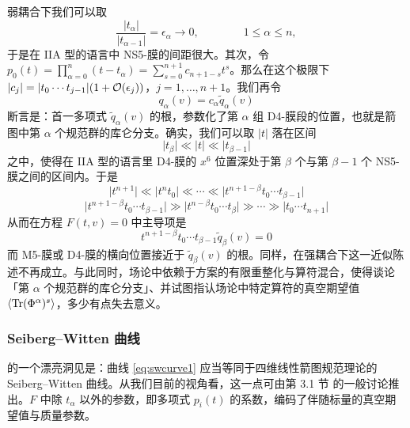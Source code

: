 弱耦合下我们可以取
\begin{equation}\label{eq:wkcpl}
\frac{\vert t_{\alpha}\vert }{\vert t_{\alpha-1} \vert}  = \epsilon_\alpha \to
0, \qquad\qquad 1\leq \alpha \leq n,
\end{equation}
于是在 IIA 型的语言中 NS5-膜的间距很大。其次，令 $p_0(t) =\prod_{\alpha=0}^n (t-t_\alpha) = \sum_{s=0}^{n+1} c_{n+1-s}t^s $。那么在这个极限下 $\vert c_j\vert = \vert t_0 \cdots t_{j-1}\vert (1+ \mathcal{O}(\epsilon_{j}) ) $，$j=1,\dots, n+1$。我们再令
\begin{equation}\label{eq:wkcpl2}
q_\alpha(v) = c_\alpha \tilde q_\alpha(v)
\end{equation}
断言是：首一多项式 $\tilde q_\alpha(v)$ 的根，参数化了第 $\alpha$ 组 D4-膜段的位置，也就是箭图中第 $\alpha$ 个规范群的库仑分支。确实，我们可以取 $\vert t\vert $ 落在区间
\begin{equation}
\label{eq:wkcpl-range}
\vert t_{\beta} \vert \ll \vert t \vert \ll \vert t_{\beta-1} \vert
\end{equation}
之中，使得在 IIA 型的语言里 D4-膜的 $x^6$ 位置深处于第 $\beta$ 个与第 $\beta-1$ 个 NS5-膜之间的区间内。于是
\begin{equation}
\label{eq:wkcpl-ineq1}
\vert t^{n+1} \vert \ll \vert t^{n} t_0 \vert \ll \cdots \ll \vert
t^{n+1-\beta} t_0 \cdots t_{\beta-1} \vert
\end{equation}
\begin{equation}
\label{eq:wkcpl-ineq2}
\vert t^{n+1-\beta} t_0 \cdots t_{\beta-1} \vert \gg \vert t^{n-\beta
}t_0\cdots t_{\beta} \vert \gg \cdots \gg \vert t_0 \cdots t_{n+1}
\vert
\end{equation}
从而在方程 $F(t,v) = 0$ 中主导项是
\begin{equation}
\label{eq:wkcpl-dom}
t^{n+1-\beta} t_0 \cdots t_{\beta-1} \tilde q_\beta(v) =0
\end{equation}
而 M5-膜或 D4-膜的横向位置接近于 $\tilde q_\beta(v)$ 的根。同样，在强耦合下这一近似陈述不再成立。与此同时，场论中依赖于方案的有限重整化与算符混合，使得谈论「第 $\alpha$ 个规范群的库仑分支」、并试图指认场论中特定算符的真空期望值 $\langle {\operatorname{Tr}} (\Phi^{\alpha})^s \rangle$，多少有点失去意义。

\subsubsection*{Seiberg–Witten 曲线}

\cite{Witten:1997sc} 的一个漂亮洞见是：曲线 \eqref{eq:swcurve1} 应当等同于四维线性箭图规范理论的 Seiberg–Witten 曲线。从我们目前的视角看，这一点可由第 3.1 节%
的一般讨论推出。$F$ 中除 $t_\alpha$ 以外的参数，即多项式 $p_i(t)$ 的系数，编码了伴随标量的真空期望值与质量参数。

